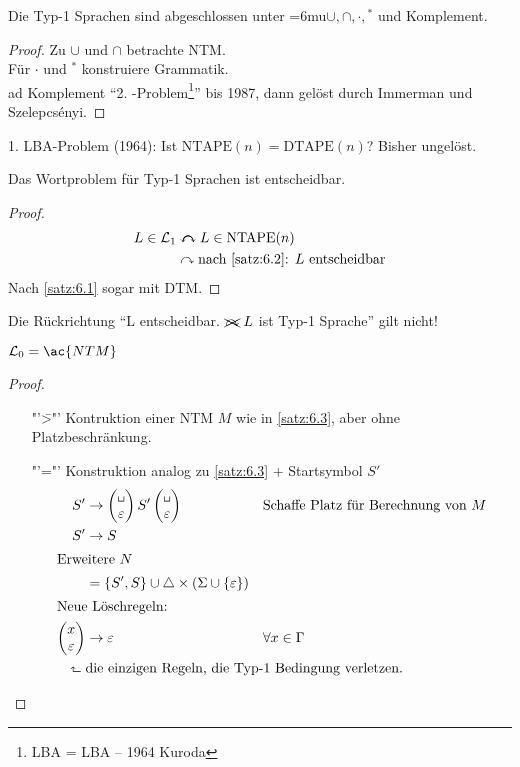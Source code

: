 {\begin{Satz}
	Die Typ-1 Sprachen sind abgeschlossen unter {\thinmuskip=6mu$\cup,\cap,\cdot,{}^*$} und Komplement.
\end{Satz}
\begin{proof}
	Zu $\cup$ und $\cap$ betrachte \ac{NTM}.\\
	Für $\cdot$ und $^*$ konstruiere Grammatik.\\
	ad Komplement "`2. -Problem\footnote{\acs*{LBA} = \acl*{LBA} -- 1964 Kuroda}"' bis 1987, dann gelöst durch Immerman und Szelepcsényi.
\end{proof}
\begin{Bemerkung}
  1. \ac{LBA}-Problem (1964): Ist $\mathrm{NTAPE}(n) = \mathrm{DTAPE}(n)$? Bisher ungelöst.
\end{Bemerkung}
\begin{Satz}
	Das Wortproblem für Typ-1 Sprachen ist entscheidbar.
\end{Satz}
\begin{proof}
	\begin{align*}
		L\in\mathcal{L}_1 &\curvearrowleftright L\in\mathrm{NTAPE}(n)\\
		&\curvearrowright \text{nach \autoref{satz:6.2}: $L$ entscheidbar}
	\end{align*}
	Nach \autoref{satz:6.1} sogar mit \ac{DTM}.
\end{proof}
Die Rückrichtung "`L entscheidbar. $\xcancel{\curvearrowright}\ L$ ist Typ-1 Sprache"' gilt nicht!

\begin{Satz}\label{satz:6.6}
	$\mathcal{L}_0 = \ac{NTM}$
\end{Satz}
\begin{proof}
	\begin{itemize}
	\item["'\=>"'] Kontruktion einer \ac{NTM} $M$ wie in \autoref{satz:6.3}, aber ohne Platzbeschränkung.
	\item["'\<="'] Konstruktion analog zu \autoref{satz:6.3} + Startsymbol $S'$
	\begin{align*}
		S' &\-> \pmqty{\blank\\\Eps} S' \pmqty{\blank\\\Eps} &&\text{Schaffe Platz für Berechnung von }M\\
		S' &\-> S\\
	\shortintertext{Erweitere $N$}
		&= \{S',S\}\cup\triangle\x(\Sigma\cup\{\Eps\})\\
	\shortintertext{Neue Löschregeln:}
		\pmqty{x\\ \Eps } &\-> \Eps &&\forall x\in\Gamma\\
		\rotatebox{90}{$\Rsh$}\ &\mathrlap{\text{die einzigen
                                          Regeln, die Typ-1 Bedingung verletzen.}} \tag*{\qedhere}
	\end{align*}
	\end{itemize}
\end{proof}

}
